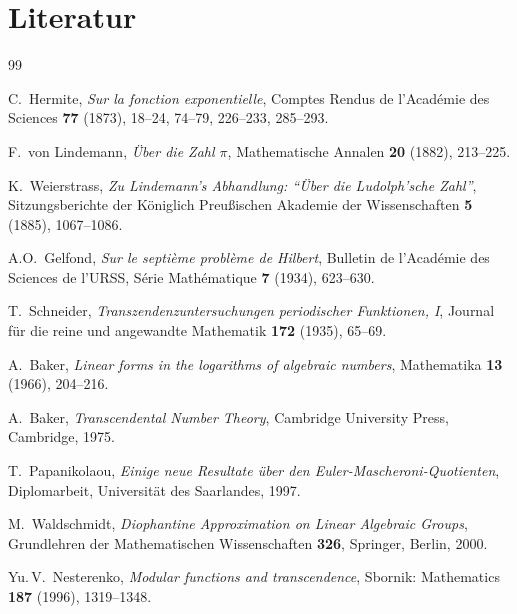 \documentclass[12pt,a4paper]{amsart}
\theoremstyle{definition}
\begin{document}
\section{Literatur}

\begin{thebibliography}{99}

C.~Hermite,
\textit{Sur la fonction exponentielle},
Comptes Rendus de l'Acad\'emie des Sciences \textbf{77} (1873), 18--24, 74--79,
226--233, 285--293.

F.~von Lindemann,
\textit{\"Uber die Zahl $\pi$},
Mathematische Annalen \textbf{20} (1882), 213--225.

K.~Weierstrass,
\textit{Zu Lindemann's Abhandlung: ``\"Uber die Ludolph'sche Zahl''},
Sitzungsberichte der K\"oniglich Preu\ss{}ischen Akademie der Wissenschaften
\textbf{5} (1885), 1067--1086.

A.O.~Gelfond,
\textit{Sur le septi\`eme probl\`eme de Hilbert},
Bulletin de l'Acad\'emie des Sciences de l'URSS, S\'erie Math\'ematique
\textbf{7} (1934), 623--630.

T.~Schneider,
\textit{Transzendenzuntersuchungen periodischer Funktionen, I},
Journal f\"ur die reine und angewandte Mathematik \textbf{172} (1935), 65--69.

A.~Baker,
\textit{Linear forms in the logarithms of algebraic numbers},
Mathematika \textbf{13} (1966), 204--216.

A.~Baker,
\textit{Transcendental Number Theory},
Cambridge University Press, Cambridge, 1975.

T.~Papanikolaou,
\textit{Einige neue Resultate \"uber den Euler-Mascheroni-Quotienten},
Diplomarbeit, Universit\"at des Saarlandes, 1997.

M.~Waldschmidt,
\textit{Diophantine Approximation on Linear Algebraic Groups},
Grundlehren der Mathematischen Wissenschaften \textbf{326},
Springer, Berlin, 2000.

Yu.\,V.~Nesterenko,
\textit{Modular functions and transcendence},
Sbornik: Mathematics \textbf{187} (1996), 1319--1348.

\end{thebibliography}
\end{document}
